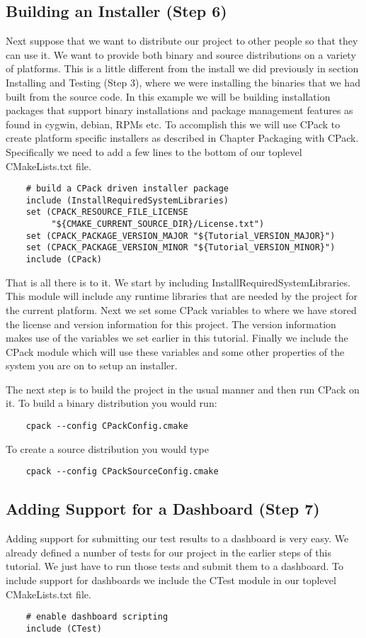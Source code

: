 \documentclass[UTF8,a4paper,8pt]{ctexart}
\begin{document}
\subsection{Building an Installer (Step 6)}
	Next suppose that we want to distribute our project to other people so that they can use it. We want to provide both binary and source distributions on a variety of platforms. This is a little different from the install we did previously in section Installing and Testing (Step 3), where we were installing the binaries that we had built from the source code. In this example we will be building installation packages that support binary installations and package management features as found in cygwin, debian, RPMs etc. To accomplish this we will use CPack to create platform specific installers as described in Chapter Packaging with CPack. Specifically we need to add a few lines to the bottom of our toplevel CMakeLists.txt file.
	\begin{lstlisting}
	# build a CPack driven installer package
	include (InstallRequiredSystemLibraries)
	set (CPACK_RESOURCE_FILE_LICENSE  
	     "${CMAKE_CURRENT_SOURCE_DIR}/License.txt")
	set (CPACK_PACKAGE_VERSION_MAJOR "${Tutorial_VERSION_MAJOR}")
	set (CPACK_PACKAGE_VERSION_MINOR "${Tutorial_VERSION_MINOR}")
	include (CPack)	
	\end{lstlisting}

	That is all there is to it. We start by including InstallRequiredSystemLibraries. This module will include any runtime libraries that are needed by the project for the current platform. Next we set some CPack variables to where we have stored the license and version information for this project. The version information makes use of the variables we set earlier in this tutorial. Finally we include the CPack module which will use these variables and some other properties of the system you are on to setup an installer.
	
	The next step is to build the project in the usual manner and then run CPack on it. To build a binary distribution you would run:
	\begin{lstlisting}
	cpack --config CPackConfig.cmake
	\end{lstlisting}
	
	To create a source distribution you would type
	\begin{lstlisting}
	cpack --config CPackSourceConfig.cmake	
	\end{lstlisting}
	
	
\subsection{Adding Support for a Dashboard (Step 7)}
	Adding support for submitting our test results to a dashboard is very easy. We already defined a number of tests for our project in the earlier steps of this tutorial. We just have to run those tests and submit them to a dashboard. To include support for dashboards we include the CTest module in our toplevel CMakeLists.txt file.
	\begin{lstlisting}
	# enable dashboard scripting
	include (CTest)	
	\end{lstlisting}
\end{document}
